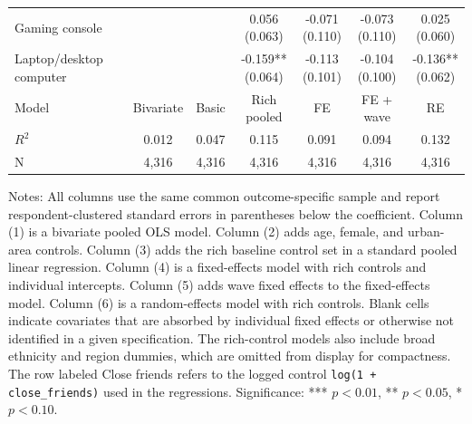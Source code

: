 \begin{table}[!htbp]
\begin{tabular}{p{}cccccc}
\\
Gaming console &  &  & \shortstack[c]{0.056 \\[-0.35ex] (0.063)} & \shortstack[c]{-0.071 \\[-0.35ex] (0.110)} & \shortstack[c]{-0.073 \\[-0.35ex] (0.110)} & \shortstack[c]{0.025 \\[-0.35ex] (0.060)}
\\
Laptop/desktop computer &  &  & \shortstack[c]{-0.159** \\[-0.35ex] (0.064)} & \shortstack[c]{-0.113 \\[-0.35ex] (0.101)} & \shortstack[c]{-0.104 \\[-0.35ex] (0.100)} & \shortstack[c]{-0.136** \\[-0.35ex] (0.062)}
\\
\hline
Model & Bivariate & Basic & Rich pooled & FE & FE + wave & RE
\\
$R^2$ & 0.012 & 0.047 & 0.115 & 0.091 & 0.094 & 0.132
\\
N & 4,316 & 4,316 & 4,316 & 4,316 & 4,316 & 4,316
\\
\hline
\end{tabular}
\renewcommand{\arraystretch}{1}
\begin{minipage}{0.97\textwidth}
\footnotesize Notes: All columns use the same common outcome-specific sample and report respondent-clustered standard errors in parentheses below the coefficient. Column (1) is a bivariate pooled OLS model. Column (2) adds age, female, and urban-area controls. Column (3) adds the rich baseline control set in a standard pooled linear regression. Column (4) is a fixed-effects model with rich controls and individual intercepts. Column (5) adds wave fixed effects to the fixed-effects model. Column (6) is a random-effects model with rich controls. Blank cells indicate covariates that are absorbed by individual fixed effects or otherwise not identified in a given specification. The rich-control models also include broad ethnicity and region dummies, which are omitted from display for compactness. The row labeled Close friends refers to the logged control \texttt{log(1 + close\_friends)} used in the regressions. Significance: *** \(p < 0.01\), ** \(p < 0.05\), * \(p < 0.10\).
\end{minipage}
\end{table}
